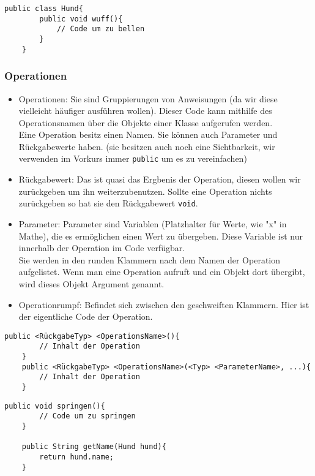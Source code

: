 \begin{lstlisting}[title=\textbf{Klassen Beispiel}]
	public class Hund{
		public void wuff(){
			// Code um zu bellen
		}
	}
\end{lstlisting}
\begin{Infobox}
	\subsubsection*{Operationen}
	\begin{itemize}
		\item Operationen: Sie sind Gruppierungen von Anweisungen (da wir diese vielleicht häufiger ausführen wollen).
			Dieser Code kann mithilfe des Operationsnamen über die Objekte einer Klasse aufgerufen werden.\\
			Eine Operation besitz einen Namen. Sie können auch Parameter und Rückgabewerte haben. (sie besitzen auch noch eine Sichtbarkeit, wir verwenden im Vorkurs immer \lstinline{public} um es zu vereinfachen)
		\item Rückgabewert: Das ist quasi das Ergbenis der Operation, diesen wollen wir zurückgeben um ihn weiterzubenutzen.
			Sollte eine Operation nichts zurückgeben so hat sie den Rückgabewert \lstinline{void}.
		\item Parameter: Parameter sind Variablen (Platzhalter für Werte, wie "x" in Mathe), die es ermöglichen einen Wert zu übergeben. Diese Variable ist nur innerhalb der Operation im Code verfügbar.\\
			Sie werden in den runden Klammern nach dem Namen der Operation aufgelistet.
			Wenn man eine Operation aufruft und ein Objekt dort übergibt, wird dieses Objekt Argument genannt.
		\item Operationrumpf: Befindet sich zwischen den geschweiften Klammern. Hier ist der eigentliche Code der Operation.
	\end{itemize}

\end{Infobox}

\begin{lstlisting}[title=\textbf{Operations Syntax}]
	public <RückgabeTyp> <OperationsName>(){
		// Inhalt der Operation
	}
	public <RückgabeTyp> <OperationsName>(<Typ> <ParameterName>, ...){
		// Inhalt der Operation
	}
\end{lstlisting}

\begin{lstlisting}[title=\textbf{Operations Beispiel}]
	public void springen(){
		// Code um zu springen
	}
	
	public String getName(Hund hund){
		return hund.name;
	}
\end{lstlisting}

